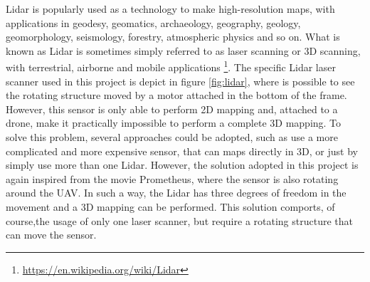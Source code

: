 \noindent Lidar is popularly used as a technology to make high-resolution maps, with applications in geodesy, geomatics, archaeology, geography, geology, geomorphology, seismology, forestry, atmospheric physics and so on. What is known as Lidar is sometimes simply referred to as laser scanning or 3D scanning, with terrestrial, airborne and mobile applications \footnote{\url{https://en.wikipedia.org/wiki/Lidar}}. The specific Lidar laser scanner used in this project is depict in figure \ref{fig:lidar}, where is possible to see the rotating structure moved by a motor attached in the bottom of the frame. However, this sensor is only able to perform 2D mapping and, attached to a drone, make it practically impossible to perform a complete 3D mapping. To solve this problem, several approaches could be adopted, such as use a more complicated and more expensive sensor, that can maps directly in 3D, or just by simply use more than one Lidar. However, the solution adopted in this project is again inspired from the movie Prometheus, where the sensor is also rotating around the UAV. In such a way, the Lidar has three degrees of freedom in the movement and a 3D mapping can be performed. This solution comports, of course,the usage of only one laser scanner, but require a rotating structure that can move the sensor.

